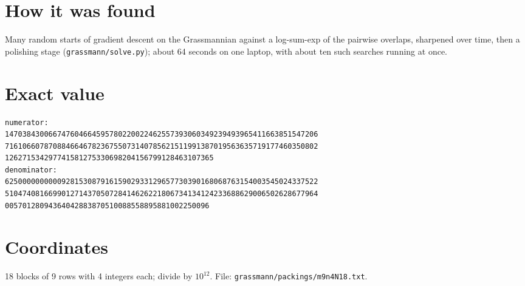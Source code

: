 \documentclass[11pt,a4paper]{article}
\begin{document}
\section{How it was found}
Many random starts of gradient descent on the Grassmannian against a log-sum-exp of the pairwise overlaps, sharpened over time, then a polishing stage (\texttt{grassmann/solve.py}); about 64 seconds on one laptop, with about ten such searches running at once.


\appendix
\section{Exact value}
{\small
\begin{verbatim}
numerator:
147038430066747604664595780220022462557393060349239493965411663851547206
716106607870884664678236755073140785621511991387019563635719177460350802
126271534297741581275330698204156799128463107365
denominator:
625000000000092815308791615902933129657730390168068763154003545024337522
510474081669901271437050728414626221806734134124233688629006502628677964
00570128094364042883870510088558895881002250096
\end{verbatim}}

\section{Coordinates}
18 blocks of 9 rows with 4 integers each; divide by $10^{12}$. File: \texttt{grassmann/packings/m9n4N18.txt}.
{\tiny
\begin{multicols}{3}
\end{multicols}}
\end{document}
